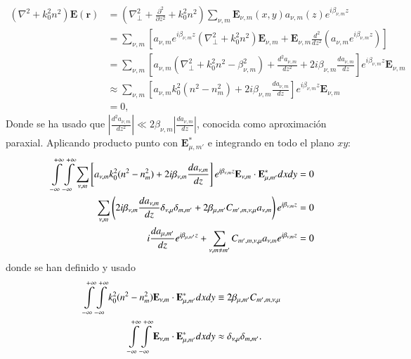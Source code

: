 \begin{align}
	(\nabla^2  + k_0^2n^2) \textbf{E}(\textbf{r}) &= \left(\nabla_\perp^2 + \frac{\partial^2}{\partial z^2} + k_0^2n^2 \right)\sum_{\nu, m} \textbf{E}_{\nu, m}(x, y) a_{\nu, m}(z) e^{i\beta_{\nu, m} z}
	\nonumber
	\\
	&= \sum_{\nu, m} \left[a_{\nu, m} e^{i\beta_{\nu, m} z} \left(\nabla_\perp^2 +k_0^2n^2 \right)\textbf{E}_{\nu, m} + \textbf{E}_{\nu, m}\frac{d^2}{d z^2}\left(a_{\nu, m} e^{i\beta_{\nu, m} z}\right)\right]
	\nonumber	
	\\
	&= \sum_{\nu, m} \left[a_{\nu, m}  \left(\nabla_\perp^2 +k_0^2n^2 -\beta_{\nu,m}^2 \right) + \frac{d^2 a_{\nu, m}}{d z^2}  +2i\beta_{\nu,m}\frac{d a_{\nu, m}}{d z} \right]e^{i\beta_{\nu, m} z}\textbf{E}_{\nu, m}
		\nonumber	
	\\
	&\approx \sum_{\nu, m} \left[a_{\nu, m}  k_0^2(n^2 - n^2_{m}) +2i\beta_{\nu,m}\frac{d a_{\nu, m}}{d z} \right]e^{i\beta_{\nu, m} z}\textbf{E}_{\nu, m}
	\nonumber	
	\\
	&= 0,
	\nonumber	
\end{align}
Donde se ha usado que $\left|\frac{d^2 a_{\nu, m}}{d z^2}\right|\ll 2\beta_{\nu,m}\left|\frac{d a_{\nu, m}}{d z}\right|  $, conocida como aproximación paraxial. Aplicando producto punto con $\textbf{E}_{\mu, m'}^*$ e integrando en todo el plano $xy$:
\begin{align}
	  \int\displaylimits_{-\infty}^{+\infty}\int\displaylimits_{-\infty}^{+\infty} \sum_{\nu, m} \left[a_{\nu, m}  k_0^2(n^2 - n^2_{m}) +2i\beta_{\nu,m}\frac{d a_{\nu, m}}{d z} \right]e^{i\beta_{\nu, m} z}\textbf{E}_{\nu, m} \cdot \textbf{E}_{\mu, m'}^* dxdy &= 0
	  \nonumber
	  \\
	  \sum_{\nu, m} \left(2i\beta_{\nu,m}\frac{d a_{\nu, m}}{d z} \delta_{\nu,\mu}\delta_{m,m'} +  2\beta_{\mu, m'}C_{m', m, \nu, \mu}   a_{\nu, m} \right)e^{i\beta_{\nu, m} z} &= 0
	  \nonumber
	  \\
	  	  i\frac{d a_{\mu, m'}}{d z} e^{i\beta_{\mu, m'} z} +  \sum_{\nu, m\neq m'}C_{m', m, \nu, \mu}   a_{\nu, m} e^{i\beta_{\nu, m} z} &= 0
	\label{eqn:CMT1}
\end{align}
donde se han definido y usado
\begin{align*}
	   \int\displaylimits_{-\infty}^{+\infty}\int\displaylimits_{-\infty}^{+\infty} k_0^2(n^2 - n^2_{m}) \textbf{E}_{\nu, m} \cdot \textbf{E}_{\mu, m'}^* dxdy &\equiv 2\beta_{\mu, m'}C_{m', m, \nu, \mu}  
	\nonumber
	\\
	\int\displaylimits_{-\infty}^{+\infty}\int\displaylimits_{-\infty}^{+\infty} \textbf{E}_{\nu, m} \cdot \textbf{E}_{\mu, m'}^* dxdy &\approx \delta_{\nu,\mu}\delta_{m,m'}.
\end{align*}

